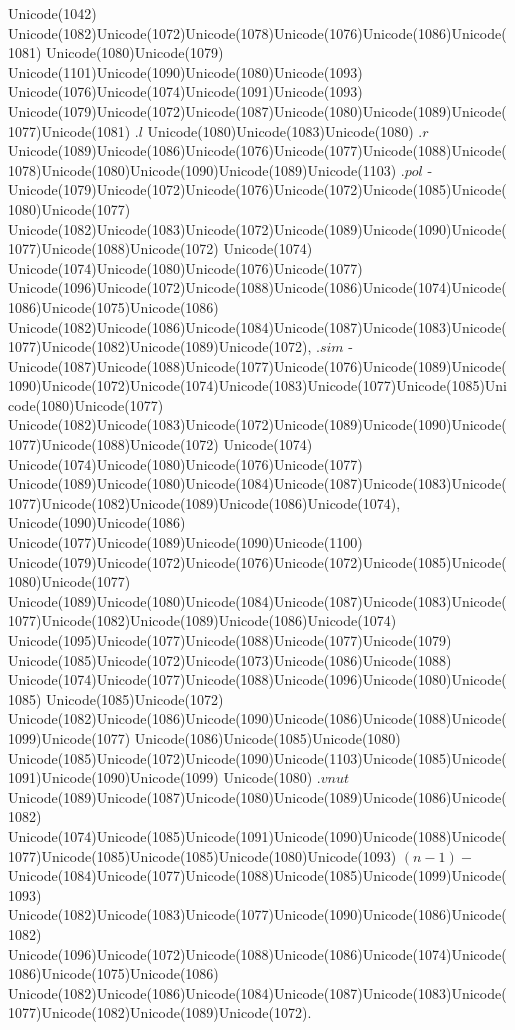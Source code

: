 \documentclass[a4paper,11pt]{report}
\begin{document}
{{{\begin{Verbatim}[commandchars=!@|,fontsize=\small,frame=single,label=Пример]
\end{Verbatim}
 Unicode(1042)
Unicode(1082)Unicode(1072)Unicode(1078)Unicode(1076)Unicode(1086)Unicode(1081)
Unicode(1080)Unicode(1079)
Unicode(1101)Unicode(1090)Unicode(1080)Unicode(1093)
Unicode(1076)Unicode(1074)Unicode(1091)Unicode(1093)
Unicode(1079)Unicode(1072)Unicode(1087)Unicode(1080)Unicode(1089)Unicode(1077)Unicode(1081) $.l$ Unicode(1080)Unicode(1083)Unicode(1080) $.r$ Unicode(1089)Unicode(1086)Unicode(1076)Unicode(1077)Unicode(1088)Unicode(1078)Unicode(1080)Unicode(1090)Unicode(1089)Unicode(1103) $.pol$ -
Unicode(1079)Unicode(1072)Unicode(1076)Unicode(1072)Unicode(1085)Unicode(1080)Unicode(1077)
Unicode(1082)Unicode(1083)Unicode(1072)Unicode(1089)Unicode(1090)Unicode(1077)Unicode(1088)Unicode(1072)
Unicode(1074) Unicode(1074)Unicode(1080)Unicode(1076)Unicode(1077)
Unicode(1096)Unicode(1072)Unicode(1088)Unicode(1086)Unicode(1074)Unicode(1086)Unicode(1075)Unicode(1086)
Unicode(1082)Unicode(1086)Unicode(1084)Unicode(1087)Unicode(1083)Unicode(1077)Unicode(1082)Unicode(1089)Unicode(1072), $.sim$ -
Unicode(1087)Unicode(1088)Unicode(1077)Unicode(1076)Unicode(1089)Unicode(1090)Unicode(1072)Unicode(1074)Unicode(1083)Unicode(1077)Unicode(1085)Unicode(1080)Unicode(1077)
Unicode(1082)Unicode(1083)Unicode(1072)Unicode(1089)Unicode(1090)Unicode(1077)Unicode(1088)Unicode(1072)
Unicode(1074) Unicode(1074)Unicode(1080)Unicode(1076)Unicode(1077)
Unicode(1089)Unicode(1080)Unicode(1084)Unicode(1087)Unicode(1083)Unicode(1077)Unicode(1082)Unicode(1089)Unicode(1086)Unicode(1074),
Unicode(1090)Unicode(1086)
Unicode(1077)Unicode(1089)Unicode(1090)Unicode(1100)
Unicode(1079)Unicode(1072)Unicode(1076)Unicode(1072)Unicode(1085)Unicode(1080)Unicode(1077)
Unicode(1089)Unicode(1080)Unicode(1084)Unicode(1087)Unicode(1083)Unicode(1077)Unicode(1082)Unicode(1089)Unicode(1086)Unicode(1074)
Unicode(1095)Unicode(1077)Unicode(1088)Unicode(1077)Unicode(1079)
Unicode(1085)Unicode(1072)Unicode(1073)Unicode(1086)Unicode(1088)
Unicode(1074)Unicode(1077)Unicode(1088)Unicode(1096)Unicode(1080)Unicode(1085)
Unicode(1085)Unicode(1072)
Unicode(1082)Unicode(1086)Unicode(1090)Unicode(1086)Unicode(1088)Unicode(1099)Unicode(1077)
Unicode(1086)Unicode(1085)Unicode(1080)
Unicode(1085)Unicode(1072)Unicode(1090)Unicode(1103)Unicode(1085)Unicode(1091)Unicode(1090)Unicode(1099)
Unicode(1080) $.vnut$ Unicode(1089)Unicode(1087)Unicode(1080)Unicode(1089)Unicode(1086)Unicode(1082)
Unicode(1074)Unicode(1085)Unicode(1091)Unicode(1090)Unicode(1088)Unicode(1077)Unicode(1085)Unicode(1085)Unicode(1080)Unicode(1093) $(n-1)-$Unicode(1084)Unicode(1077)Unicode(1088)Unicode(1085)Unicode(1099)Unicode(1093)
Unicode(1082)Unicode(1083)Unicode(1077)Unicode(1090)Unicode(1086)Unicode(1082)
Unicode(1096)Unicode(1072)Unicode(1088)Unicode(1086)Unicode(1074)Unicode(1086)Unicode(1075)Unicode(1086)
Unicode(1082)Unicode(1086)Unicode(1084)Unicode(1087)Unicode(1083)Unicode(1077)Unicode(1082)Unicode(1089)Unicode(1072). }

}}
\end{document}
